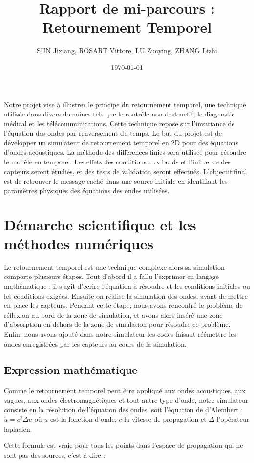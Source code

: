 \documentclass[11pt, a4paper]{article}
\title{Rapport de mi-parcours : Retournement Temporel}
\author{SUN Jixiang, ROSART Vittore, LU Zuoying, ZHANG Lizhi}
\date{\today}
\begin{document}
\maketitle
\thispagestyle{fancy}


Notre projet vise à illustrer le principe du retournement temporel, une technique utilisée dans divers domaines tels que le contrôle non destructif, le diagnostic médical et les télécommunications. Cette technique repose sur l'invariance de l'équation des ondes par renversement du temps. Le but du projet est de développer un simulateur de retournement temporel en 2D pour des équations d'ondes acoustiques. La méthode des différences finies sera utilisée pour résoudre le modèle en temporel. Les effets des conditions aux bords et l'influence des capteurs seront étudiés, et des tests de validation seront effectués. L'objectif final est de retrouver le message caché dans une source initiale en identifiant les paramètres physiques des équations des ondes utilisées.

\section{Démarche scientifique et les méthodes numériques}
Le retournement temporel est une technique complexe alors sa simulation comporte plusieurs étapes. Tout d'abord il a fallu l'exprimer en langage mathématique : il s'agit d'écrire l'équation à résoudre et les conditions initiales ou les conditions exigées. Ensuite on réalise la simulation des ondes, avant de mettre en place les capteurs. Pendant cette étape, nous avons rencontré le problème de réflexion au bord de la zone de simulation, et avons alors inséré une zone d'absorption en dehors de la zone de simulation pour résoudre ce problème. Enfin, nous avons ajouté dans notre simulateur les codes faisant réémettre les ondes enregistrées par les capteurs au cours de la simulation.
\subsection{Expression mathématique}
Comme le retournement temporel peut être appliqué aux ondes acoustiques, aux vagues, aux ondes électromagnétiques et tout autre type d'onde, notre simulateur consiste en la résolution de l'équation des ondes, soit l'équation de d'Alembert : $\ddot{u}=c^2\Delta u $ où $u$ est la fonction d'onde, $c$ la vitesse de propagation et $\Delta$ l'opérateur laplacien.

Cette formule est vraie pour tous les points dans l'espace de propagation qui ne sont pas des sources, c'est-à-dire :
\end{document}
